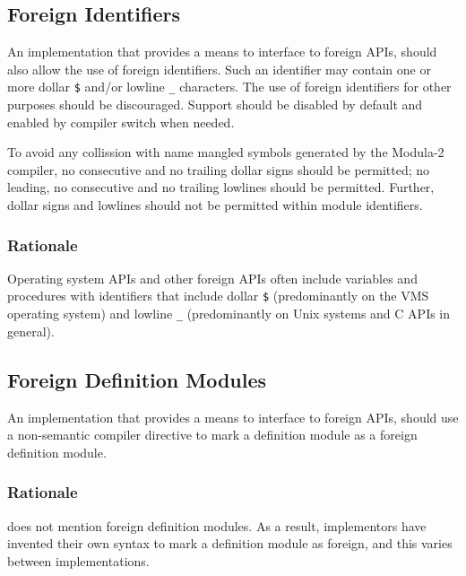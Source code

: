 \documentclass[10pt,a4paper]{article}
\begin{document}
\subsection{Foreign Identifiers}

An implementation that provides a means to interface to \glspl{foreign API},
should also allow the use of \glspl{foreign identifier}. Such an identifier may
contain one or more dollar \verb|$| and/or lowline \verb|_| characters. The use
of \glspl{foreign identifier} for other purposes should be discouraged. 
Support should be disabled by default and enabled by compiler switch when
needed.

To avoid any collission with name mangled symbols generated by the Modula-2
compiler, no consecutive and no trailing dollar signs should be permitted; no
leading, no consecutive and no trailing lowlines should be permitted. Further,
dollar signs and lowlines should not be permitted within module identifiers. 

\subsubsection{Rationale}

Operating system \Glspl{API} and other \glspl{foreign API} often include
variables and procedures with identifiers that include dollar \verb|$|
(predominantly on the VMS operating system) and lowline \verb|_|
(predominantly on Unix systems and C \glspl{API} in general).


\subsection{Foreign Definition Modules}

An implementation that provides a means to interface to \glspl{foreign API},
should use a \gls{non-semantic compiler directive} to mark a definition module
as a \gls{foreign definition module}.

\subsubsection{Rationale}

\cite{Wirth88} does not mention \glspl{foreign definition module}. As a result,
implementors have invented their own syntax to mark a definition module as
foreign, and this varies between implementations.
\end{document}
